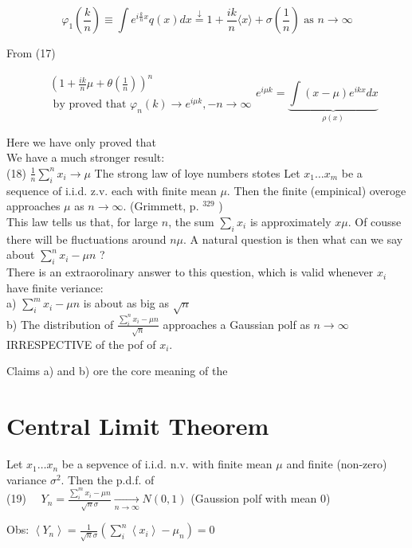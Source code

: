 \documentclass[10pt]{article}
\begin{document}
$$
\varphi_{1}\left(\frac{k}{n}\right) \equiv \int e^{i \frac{k}{n} x} q(x) d x \stackrel{\downarrow}{=} 1+\frac{i k}{n}\langle x\rangle+\sigma\left(\frac{1}{n}\right) \text { as } n \rightarrow \infty
$$

From (17)

$$
\begin{aligned}
& \left(1+\frac{i k}{n} \mu+\theta\left(\frac{1}{n}\right)\right)^{n} \\
& \text { by proved that } \varphi_{n}(k) \rightarrow e^{i \mu k},-n \rightarrow \infty
\end{aligned} e^{i \mu k}=\underbrace{\int(x-\mu) e^{i k x} d x}_{\rho(x)}
$$

Here we have only proved that\\
We have a much stronger result:\\
(18) $\frac{1}{n} \sum_{i}^{n} x_{i} \rightarrow \mu$ The strong law of loye numbers stotes Let $x_{1} \ldots x_{m}$ be a sequence of i.i.d. z.v. each with finite mean $\mu$. Then the finite (empinical) overoge approaches $\mu$ as $n \rightarrow \infty$. (Grimmett, p. ${ }^{329}$ )\\
This law tells us that, for large $n$, the sum $\sum_{i} x_{i}$ is approximately $x \mu$. Of cousse there will be fluctuations around $n \mu$. A natural question is then what can we say about $\sum_{i}^{n} x_{i}-\mu n$ ?\\
There is an extraorolinary answer to this question, which is valid whenever $x_{i}$ have finite veriance:\\
a) $\sum_{i}^{m} x_{i}-\mu n$ is about as big as $\sqrt{n}$\\
b) The distribution of $\frac{\sum_{i}^{n} x_{i}-\mu n}{\sqrt{n}}$ approaches a Gaussian polf as $n \rightarrow \infty$ IRRESPECTIVE of the pof of $x_{i}$.

Claims a) and b) ore the core meaning of the

\section*{Central Limit Theorem}
Let $x_{1} \ldots x_{n}$ be a sepvence of i.i.d. n.v. with finite mean $\mu$ and finite (non-zero) variance $\sigma^{2}$. Then the p.d.f. of\\
(19) $\quad Y_{n}=\frac{\sum_{i}^{m} x_{i}-\mu n}{\sqrt{n} \sigma} \xrightarrow[n \rightarrow \infty]{ } N(0,1)$ (Gaussion polf with mean 0)

Obs: $\left\langle Y_{n}\right\rangle=\frac{1}{\sqrt{n} \sigma}\left(\sum_{i}^{n}\left\langle x_{i}\right\rangle-\mu_{n}\right)=0$
\end{document}
